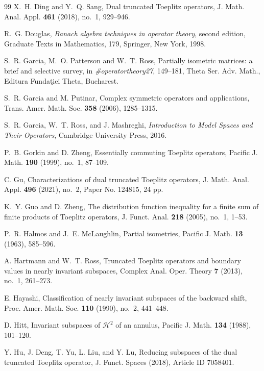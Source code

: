 \documentclass[12pt]{amsart}
\theoremstyle{definition}
\theoremstyle{remark}
\newcommand{\clh}{\mathcal{H}}
\numberwithin{equation}{section}
\begin{document}
\begin{thebibliography}{99}
X.~H. Ding and Y.~Q. Sang, Dual truncated Toeplitz operators, J. Math. Anal. Appl. {\bf 461} (2018), no.~1, 929--946.


R.~G. Douglas, {\it Banach algebra techniques in operator theory}, second edition, Graduate Texts in Mathematics, 179, Springer, New York, 1998.

S.~R. Garcia, M.~O. Patterson and W.~T. Ross, Partially isometric matrices: a brief and selective survey, in {\it \#operatortheory27}, 149--181, Theta Ser. Adv. Math., Editura Funda\c tiei Theta, Bucharest.

S.~R. Garcia and M. Putinar, Complex symmetric operators and applications, Trans. Amer. Math. Soc. {\bf 358} (2006), 1285--1315.

S.~R. Garcia, W.~T. Ross, and J. Mashreghi, {\it Introduction to Model Spaces and Their Operators}, Cambridge University Press, 2016.

P.~B. Gorkin and D. Zheng, Essentially commuting Toeplitz operators, Pacific J. Math. {\bf 190} (1999), no.~1, 87--109.

C. Gu, Characterizations of dual truncated Toeplitz operators, J. Math. Anal. Appl. {\bf 496} (2021), no.~2, Paper No. 124815, 24 pp.

K.~Y. Guo and D. Zheng, The distribution function inequality for a finite sum of finite products of Toeplitz operators, J. Funct. Anal. {\bf 218} (2005), no.~1, 1--53.

P.~R. Halmos and J.~E. McLaughlin, Partial isometries, Pacific J. Math. {\bf 13} (1963), 585--596.

A. Hartmann and W.~T. Ross, Truncated Toeplitz operators and boundary values in nearly invariant subspaces, Complex Anal. Oper. Theory {\bf 7} (2013), no.~1, 261--273.

E. Hayashi, Classification of nearly invariant subspaces of the backward shift, Proc. Amer. Math. Soc. {\bf 110} (1990), no.~2, 441--448.

D. Hitt, Invariant subspaces of $\clh^2$ of an annulus, Pacific J. Math. {\bf 134} (1988), 101--120.

Y. Hu, J. Deng, T. Yu, L. Liu, and Y. Lu, Reducing subspaces of the dual truncated Toeplitz operator, J. Funct. Spaces (2018), Article ID 7058401.


\end{thebibliography}
\end{document}
